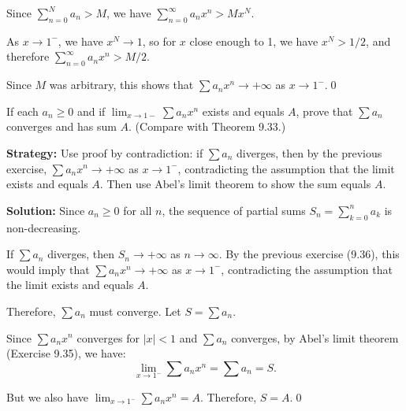 Since \( \sum_{n=0}^N a_n > M \), we have \( \sum_{n=0}^{\infty} a_n x^n > M x^N \).

As \( x \to 1^- \), we have \( x^N \to 1 \), so for \( x \) close enough to 1, we have \( x^N > 1/2 \), and therefore \( \sum_{n=0}^{\infty} a_n x^n > M/2 \).

Since \( M \) was arbitrary, this shows that \( \sum a_n x^n \to +\infty \) as \( x \to 1^- \).\qed


\begin{problembox}
If each \( a_n \geq 0 \) and if \( \lim_{x \to 1-} \sum a_n x^n \) exists and equals \( A \), prove that \( \sum a_n \) converges and has sum \( A \). (Compare with Theorem 9.33.)
\end{problembox}

\noindent\textbf{Strategy:} Use proof by contradiction: if \( \sum a_n \) diverges, then by the previous exercise, \( \sum a_n x^n \to +\infty \) as \( x \to 1^- \), contradicting the assumption that the limit exists and equals \( A \). Then use Abel's limit theorem to show the sum equals \( A \).

\bigskip\noindent\textbf{Solution:} Since \( a_n \geq 0 \) for all \( n \), the sequence of partial sums \( S_n = \sum_{k=0}^n a_k \) is non-decreasing.

If \( \sum a_n \) diverges, then \( S_n \to +\infty \) as \( n \to \infty \). By the previous exercise (9.36), this would imply that \( \sum a_n x^n \to +\infty \) as \( x \to 1^- \), contradicting the assumption that the limit exists and equals \( A \).

Therefore, \( \sum a_n \) must converge. Let \( S = \sum a_n \).

Since \( \sum a_n x^n \) converges for \( |x| < 1 \) and \( \sum a_n \) converges, by Abel's limit theorem (Exercise 9.35), we have:
\[\lim_{x \to 1^-} \sum a_n x^n = \sum a_n = S.\]

But we also have \( \lim_{x \to 1^-} \sum a_n x^n = A \). Therefore, \( S = A \).\qed


